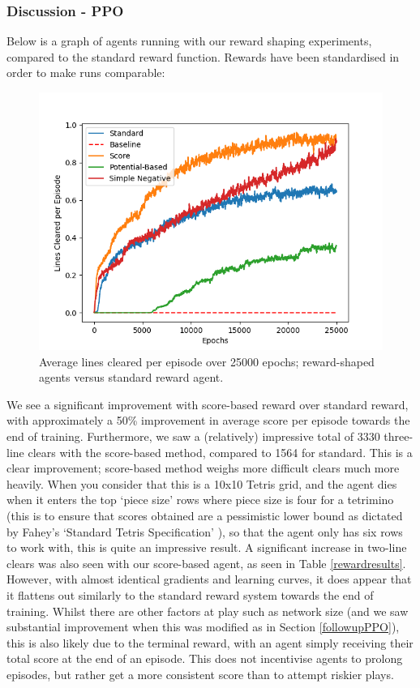 \documentclass[12pt]{article}
\begin{document}
\subsubsection{Discussion - PPO}\label{pporeward}
Below is a graph of agents running with our reward shaping experiments, compared to the standard reward function. Rewards have been standardised in order to make runs comparable: 
\begin{figure}[H]
    \centering
    \includegraphics[scale=0.7]{25.png}
    \caption{Average lines cleared per episode over 25000 epochs; reward-shaped agents versus standard reward agent.}
    \label{rewardagents}
\end{figure}
We see a significant improvement with score-based reward over standard reward, with approximately a 50\% improvement in average score per episode towards the end of training. Furthermore, we saw a (relatively) impressive total of 3330 three-line clears with the score-based method, compared to 1564 for standard. This is a clear improvement; score-based method weighs more difficult clears much more heavily. When you consider that this is a 10x10 Tetris grid, and the agent dies when it enters the top `piece size' rows where piece size is four for a tetrimino (this is to ensure that scores obtained are a pessimistic lower bound as dictated by Fahey's `Standard Tetris Specification' \autocite{fahey}), so that the agent only has six rows to work with, this is quite an impressive result. A significant increase in two-line clears was also seen with our score-based agent, as seen in Table \ref{rewardresults}.  However, with almost identical gradients and learning curves, it does appear that it flattens out similarly to the standard reward system towards the end of training. Whilst there are other factors at play such as network size (and we saw substantial improvement when this was modified as in Section \ref{followupPPO}), this is also likely due to the terminal reward, with an agent simply receiving their total score at the end of an episode. This does not incentivise agents to prolong episodes, but rather get a more consistent score than to attempt riskier plays.\\\newline
\end{document}
